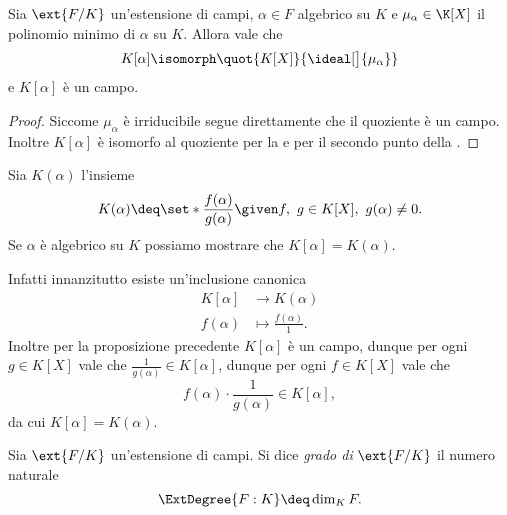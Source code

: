 \begin{proposition}
    Sia $\ext{F/K}$ un'estensione di campi, $\alpha \in F$ algebrico su $K$ e $\mu_\alpha \in \K[X]$ il polinomio minimo di $\alpha$ su $K$. Allora vale che \[
        K[\alpha] \isomorph \quot{K[X]}{\ideal[\big]{\mu_\alpha}}
    \] e $K[\alpha]$ è un campo.
\end{proposition}
\begin{proof}
    Siccome $\mu_\alpha$ è irriducibile segue direttamente che il quoziente è un campo. Inoltre $K[\alpha]$ è isomorfo al quoziente per la  e per il secondo punto della .
\end{proof}

\begin{remark}
    Sia $K(\alpha)$ l'insieme \[
        K(\alpha) \deq \set*{\frac{f(\alpha)}{g(\alpha)} \given f,\ g \in K[X],\ g(\alpha) \neq 0}.    
    \] Se $\alpha$ è algebrico su $K$ possiamo mostrare che $K[\alpha] = K(\alpha)$.

    Infatti innanzitutto esiste un'inclusione canonica \begin{align*}
        K[\alpha] &\to K(\alpha)\\
        f(\alpha) &\mapsto \frac{f(\alpha)}{1}.
    \end{align*} Inoltre per la proposizione precedente $K[\alpha]$ è un campo, dunque per ogni $g \in K[X]$ vale che $\frac{1}{g(\alpha)} \in K[\alpha]$, dunque per ogni $f \in K[X]$ vale che \[
        f(\alpha) \cdot \frac{1}{g(\alpha)} \in K[\alpha],    
    \] da cui $K[\alpha] = K(\alpha)$.
\end{remark}

\begin{definition}
    Sia $\ext{F/K}$ un'estensione di campi. Si dice \emph{grado di} $\ext{F/K}$ il numero naturale \[
        \ExtDegree{F : K} \deq \dim_K F.    
    \]
\end{definition}

